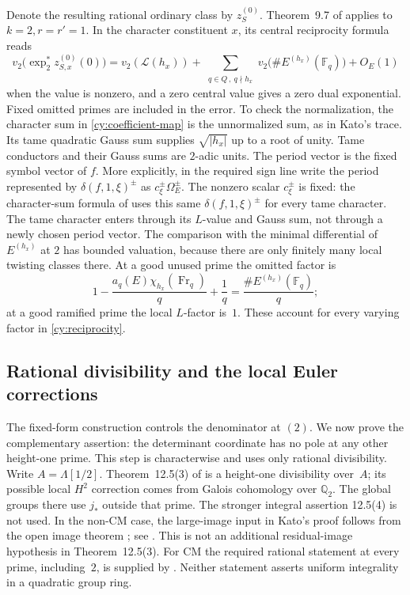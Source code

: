 Denote the resulting rational ordinary class by $z_S^{(0)}$.  Theorem~9.7 of
\cite{Kato2004} applies to $k=2,r=r'=1$.  In the character constituent
$x$, its central reciprocity formula reads
\begin{equation}\label{cy:reciprocity}
 v_2\bigl(\exp_2^*z_{S,x}^{(0)}(0)\bigr)
 =v_2(\mathcal L(h_x))+
  \sum_{\substack{q\in Q\,,\ q\nmid h_x}}
       v_2\bigl(\#E^{(h_x)}(\mathbb F _q)\bigr)+O_E(1)
\end{equation}
when the value is nonzero, and a zero central value gives a zero dual
exponential.  Fixed omitted primes are included in the error.
To check the normalization, the character sum in
\eqref{cy:coefficient-map} is the unnormalized sum, as in Kato's trace.
Its tame quadratic Gauss sum supplies $\sqrt{|h_x|}$ up to a root of
unity.  Tame conductors and their Gauss sums are $2$-adic units.  The
period vector is the fixed symbol vector of $f$.  More explicitly,
in the required sign line write the period represented by
$\delta(f,1,\xi)^{\pm}$ as $c_\xi^{\pm}\Omega_E^{\pm}$.
The nonzero scalar $c_\xi^{\pm}$ is fixed: the character-sum formula
of \cite[Theorem~6.6]{Kato2004} uses this same $\delta(f,1,\xi)^{\pm}$
for every tame character.  The tame character enters through its
$L$-value and Gauss sum, not through a newly chosen period vector.
The comparison with the minimal differential of $E^{(h_x)}$ at $2$ has bounded valuation,
because there are only finitely many local twisting classes there.
At a good unused prime the omitted factor is
\[
 1-\frac{a_q(E)\chi_{h_x}(\operatorname{Fr}_q)}q+\frac1q
       =\frac{\#E^{(h_x)}(\mathbb F _q)}q;
\]
at a good ramified prime the local $L$-factor is~$1$.  These account for
every varying factor in \eqref{cy:reciprocity}.

\subsection{Rational divisibility and the local Euler corrections}

The fixed-form construction controls the denominator at $(2)$.  We now
prove the complementary assertion: the determinant coordinate has no
pole at any other height-one prime.  This step is characterwise and uses
only rational divisibility.  Write $A=\Lambda[1/2]$.  Theorem~12.5(3) of
\cite{Kato2004} is a height-one divisibility over~$A$; its possible local
$H^2$ correction comes from Galois cohomology over $\mathbb Q_2$.
The global groups there use $j_*$ outside that prime.  The stronger integral assertion
12.5(4) is not used.  In the non-CM case, the large-image input in Kato's
proof follows from the open image theorem \cite{Serre1972}; see
\cite[Remark~12.8, (12.8.2), Theorem~13.4(v), and Section~13.13]{Kato2004}.
This is not an additional residual-image hypothesis in Theorem~12.5(3).
For CM the required rational statement at every prime, including~$2$, is supplied by
\cite[Theorem~2.6 and Remark~2.7]{BurungaleTian2026}.  Neither statement
asserts uniform integrality in a quadratic group ring.

